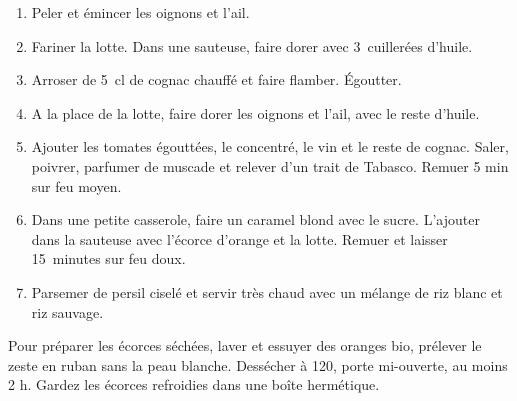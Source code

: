 \serves{}
\prep{}

\begin{ingredients}
\end{ingredients}


\begin{recipe}
  \begin{enumerate}

  \item Peler et émincer les oignons et l’ail.

  \item Fariner la lotte. Dans une sauteuse, faire dorer avec 3~cuillerées d’huile.

  \item Arroser de 5~cl de cognac chauffé et faire flamber. Égoutter.

  \item A la place de la lotte, faire dorer les oignons et l’ail, avec le reste d’huile.

  \item Ajouter les tomates égouttées, le concentré, le vin et le
    reste de cognac. Saler, poivrer, parfumer de muscade et relever
    d’un trait de Tabasco. Remuer 5 min sur feu moyen.
    
  \item Dans une petite casserole, faire un caramel blond avec le
    sucre. L'ajouter dans la sauteuse avec l’écorce d’orange et la
    lotte.  Remuer et laisser 15~minutes sur feu doux.

  \item Parsemer de persil ciselé et servir très chaud avec un mélange
    de riz blanc et riz sauvage.

  \end{enumerate}
\end{recipe}

Pour préparer les écorces séchées, laver et essuyer des oranges bio,
prélever le zeste en ruban sans la peau blanche. Dessécher à 120\C,
porte mi-ouverte, au moins 2 h. Gardez les écorces refroidies dans une
boîte hermétique.

